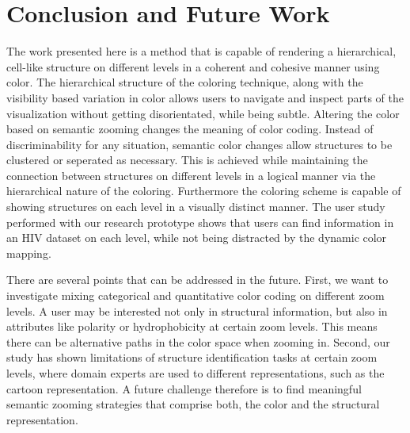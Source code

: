 \documentclass{egpubl}
\begin{document}
	\section{Conclusion and Future Work}
	The work presented here is a method that is capable of rendering a hierarchical, cell-like structure on different levels in a coherent and cohesive manner using color. 
	The hierarchical structure of the coloring technique, along with the visibility based variation in color allows users to navigate and inspect parts of the visualization without getting disorientated, while being subtle.
	Altering the color based on semantic zooming changes the meaning of color coding.
	Instead of discriminability for any situation, semantic color changes allow structures to be clustered or seperated as necessary.
	This is achieved while maintaining the connection between structures on different levels in a logical manner via the hierarchical nature of the coloring.
	Furthermore the coloring scheme is capable of showing structures on each level in a visually distinct manner. 
	The user study performed with our research prototype shows that users can find information in an HIV dataset on each level, while not being distracted by the dynamic color mapping. 
	
	There are several points that can be addressed in the future. 
	First, we want to investigate mixing categorical and quantitative color coding on different zoom levels. 
	A user may be interested not only in structural information, but also in attributes like polarity or hydrophobicity at certain zoom levels. 
	This means there can be alternative paths in the color space when zooming in. 
	Second, our study has shown limitations of structure identification tasks at certain zoom levels, where domain experts are used to different representations, such as the cartoon representation. 
	A future challenge therefore is to find meaningful semantic zooming strategies that comprise both, the color and the structural representation. 
	
\end{document}
